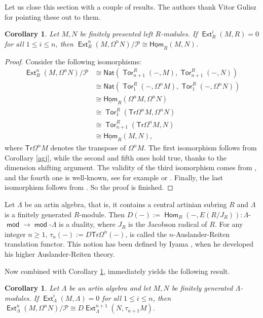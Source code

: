 \documentclass[11pt,a4paper]{amsart}
\newcommand{\lrt}{\longrightarrow}
\newcommand{\p}{\mathfrak{p} }
\def\Ext{\operatorname{{\mathsf{Ext}}}}
\def\hom{\operatorname{{\mathsf{Hom}}}}
\def\uhom{\operatorname{\underline{\mathsf{Hom}}}}
\def\Tor{\operatorname{\mathsf{Tor}}}
\def\hom{\operatorname{\mathsf{Hom}}}
\def\md{\operatorname{\mathsf{mod}}}
\def\syz{\mathsf{\Omega}}
\def\tr{\mathsf {Tr}}
\def\p{\mathcal P}
\newcommand{\nat}{{\mathsf{Nat}}}
\newtheorem{cor}[theorem]{Corollary}
\theoremstyle{definition}
\theoremstyle{plain}
\theoremstyle{definition}
\numberwithin{equation}{section}
\begin{document}
Let us close this section with a couple of results. The authors thank Vitor  Gulisz for pointing these out to them.
\begin{cor}\label{vit}Let $M, N$ be finitely presented left $R$-modules. If $\Ext^i_R(M, R)=0$ for all $1\leq i\leq n$, then $\Ext^n_R(M, \syz^nN)/{\p}\cong\uhom_{R}(M, N)$.
\end{cor}
\begin{proof}Consider the following isomorphisms:
\[\begin{array}{lllll}
\Ext^n_R(M, \syz^nN)/{\p} & \cong \nat(\Tor^{R}_{n+1}(-, M), \Tor^{R}_{n+1}(-, N))\\
& \cong \nat(\Tor^{R}_1(-, \syz^nM), \Tor^R_1(-, \syz^nN))\\ &\cong\uhom_R(\syz^nM, \syz^nN)\\
&\cong\Tor_1^R(\tr\syz^nM, \syz^nN)\\
&\cong\Tor_{n+1}^R(\tr\syz^nM, N)\\
&\cong\uhom_R(M, N),
\end{array}\]
where $\tr\syz^nM$ denotes the transpose of $\syz^nM$. The first isomorphism follows from Corollary \ref{agj}, while the second and fifth ones hold true, thanks to the dimension shifting argument. The validity of the third isomorphism comes from \cite[Lemma 9]{mart}, and the fourth one is well-known, see for example \cite[Lemma 3.9]{yo} or \cite[Proposition 65]{gu}. Finally, the last isomorphism follows from \cite[Proposition 1.1.3]{iy}. So the proof is finished.
\end{proof}

Let $\Lambda$ be an artin algebra, that is, it contains a central artinian subring $R$ and $\Lambda$ is a finitely generated $R$-module. Then $D(-):=\hom_R(-, E(R/{J_R})): \Lambda$-$\md\lrt\md$-$\Lambda$ is a duality, where $J_R$ is the Jacobson radical of $R$. For any integer $n\geq 1$, $\tau_n(-):=D\tr\syz^n(-)$, is called the $n$-Auslander-Reiten translation functor. This notion has been defined by Iyama \cite{iy}, when he developed his
higher Auslander-Reiten theory.

Now \cite[Theorem 1.5]{iy} combined with Corollary \ref{vit}, immediately yields the following result.
\begin{cor}Let $\Lambda$ be an artin algebra and let $M, N$ be finitely generated $\Lambda$-modules. If $\Ext^i_{\Lambda}(M, \Lambda)=0$ for all $1\leq i\leq n$, then $\Ext^n_{\Lambda}(M, \syz^nN)/{\p}\cong D\Ext^{n+1}_{\Lambda}(N, \tau_{n+1}M).$
\end{cor}
\end{document}
